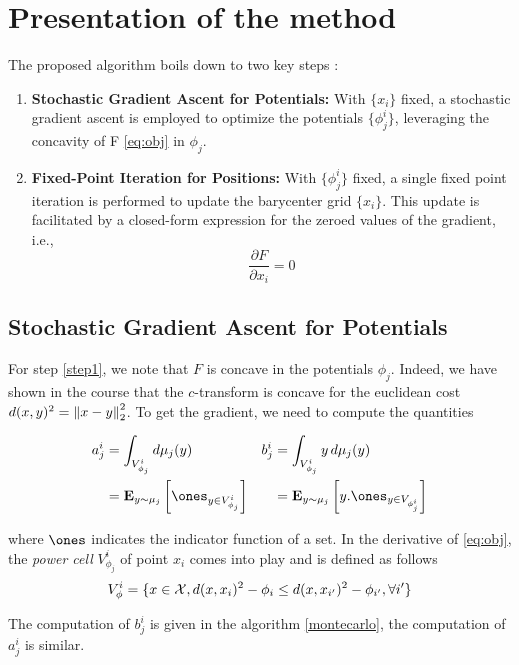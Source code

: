 \section{Presentation of the method}
\label{sec:method}

The proposed algorithm \cite{claici_stochastic_2018} boils down to two key steps :
\begin{enumerate}
    \item \label{step1} \textbf{Stochastic Gradient Ascent for Potentials:} With $\lbrace x_i \rbrace$ fixed, a stochastic gradient ascent is employed to optimize the potentials $\lbrace \phi_j^i \rbrace$, leveraging the concavity of F \eqref{eq:obj} in $\phi_j$.
    \item \textbf{Fixed-Point Iteration for Positions:} With $\lbrace \phi_j^i \rbrace$ fixed, a single fixed point iteration is performed to update the barycenter grid $\lbrace x_i \rbrace$. This update is facilitated by a closed-form expression for the zeroed values of the gradient, i.e., $$\frac{\partial F}{\partial x_i} = 0$$
\end{enumerate}

\subsection{Stochastic Gradient Ascent for Potentials}

For step \ref{step1}, we note that $F$ is concave in the potentials $\phi_j$. Indeed, we have shown in the course \cite{peyre_computational_2020} that the $c$-transform is concave for the euclidean cost $d(x, y)^2 = \left\lVert x - y\right\rVert_2^2$. 
To get the gradient, we need to compute the quantities 


\begin{align*}
    a^i_j &= \int_{V_{\phi_j}^i} d\mu_j(y) & b_j^i &= \int_{V_{\phi_j}^i} y\, d\mu_j(y) \\
     &= \E_{y \sim \mu_j}\left[ \ones_{y\in V_{\phi_j}^i}\right] & & =\E_{y \sim \mu_j}\left[ y . \ones_{y\in V_{\phi_j^i}}\right] \\
\end{align*}

where $\ones$ indicates the indicator function of a set. In the derivative of \eqref{eq:obj}, the \textit{power cell} $V_{\phi_j}^i$ of point $x_i$ comes into play and is defined as follows 
$$
V_{\phi}^i = \lbrace x\in\mathcal{X}, d(x, x_i)^2 - \phi_i \leq d(x, x_{i'})^2 - \phi_{i'}, \forall i'  \rbrace
$$

The computation of $b_j^i$ is given in the algorithm \ref{montecarlo}, the computation of $a_j^i$ is similar. 

